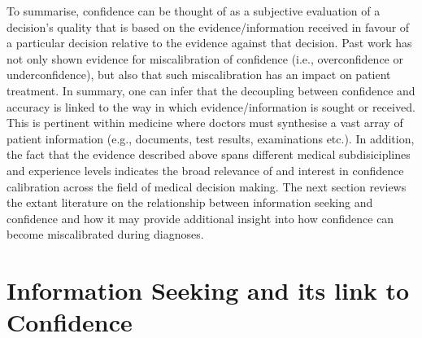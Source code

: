\documentclass[a4paper, nobind]{templates/ociamthesis}
\begin{document}
\hfill\break
To summarise, confidence can be thought of as a subjective evaluation of a decision's quality that is based on the evidence/information received in favour of a particular decision relative to the evidence against that decision. Past work has not only shown evidence for miscalibration of confidence (i.e., overconfidence or underconfidence), but also that such miscalibration has an impact on patient treatment. In summary, one can infer that the decoupling between confidence and accuracy is linked to the way in which evidence/information is sought or received. This is pertinent within medicine where doctors must synthesise a vast array of patient information (e.g., documents, test results, examinations etc.). In addition, the fact that the evidence described above spans different medical subdisiciplines and experience levels indicates the broad relevance of and interest in confidence calibration across the field of medical decision making. The next section reviews the extant literature on the relationship between information seeking and confidence and how it may provide additional insight into how confidence can become miscalibrated during diagnoses.

\section{Information Seeking and its link to Confidence}\label{information-seeking-and-its-link-to-confidence}
\end{document}
